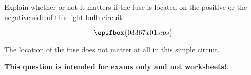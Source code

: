 

Explain whether or not it matters if the fuse is located on the positive or the negative side of this light bulb circuit:

$$\epsfbox{03367x01.eps}$$







The location of the fuse does not matter at all in this simple circuit.







{\bf This question is intended for exams only and not worksheets!}.



